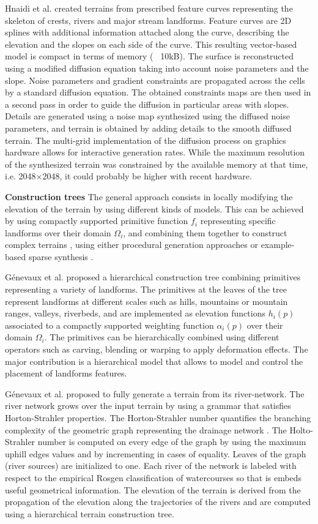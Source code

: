 \documentclass{article}
\begin{document}
Hnaidi et al. \cite{HGA10b} created terrains from prescribed feature curves representing the skeleton of crests, rivers and major stream landforms. Feature curves are 2D splines with additional information attached along the curve, describing the elevation and the slopes on each side of the curve. This resulting vector-based model is compact in terms of memory (~ 10kB). The surface is reconstructed using a modified diffusion equation taking into account noise parameters and the slope. Noise parameters and gradient constraints are propagated across the cells by a standard diffusion equation. The obtained constraints maps are then used in a second pass in order to guide the diffusion in particular areas with slopes. Details are generated using a noise map synthesized using the diffused noise parameters, and terrain is obtained by adding details to the smooth diffused terrain. The multi-grid implementation of the diffusion process on graphics hardware allows for interactive generation rates. While the maximum resolution of the synthesized terrain was constrained by the available memory at that time, i.e. 2048×2048, it could probably be higher with recent hardware.

\textbf{Construction trees} The general approach consists in locally modifying the elevation of the terrain by using different kinds of models. This can be achieved by using compactly supported primitive function $f_i$ representing specific landforms over their domain $\Omega_i$, and combining them together to construct complex terrains \cite{GGP15}, using either procedural generation approaches \cite{GGG13} or example-based sparse synthesis \cite{GDGP16}.

Génevaux et al. \cite{GGP15} proposed a hierarchical construction tree combining primitives representing a variety of landforms. The primitives at the leaves of the tree represent landforms at different scales such as hills, mountains or mountain ranges, valleys, riverbeds, and are implemented as elevation functions $h_i(p)$ associated to a compactly supported weighting function $\alpha_i(p)$ over their domain $\Omega_i$. The primitives can be hierarchically combined using different operators such as carving, blending or warping to apply deformation effects. The major contribution is a hierarchical model that allows to model and control the placement of landforms features.

Génevaux et al. \cite{GGG13} proposed to fully generate a terrain from its river-network. The river network grows over the input terrain by using a grammar that satisfies Horton-Strahler properties. The Horton-Strahler number quantifies the branching complexity of the geometric graph representing the drainage network \cite{Hor45}. The Holto-Strahler number is computed on every edge of the graph by using the maximum uphill edges values and by incrementing in cases of equality. Leaves of the graph (river sources) are initialized to one. Each river of the network is labeled with respect to the empirical Rosgen classification of watercourses \cite{Ros94} so that is embeds useful geometrical information. The elevation of the terrain is derived from the propagation of the elevation along the trajectories of the rivers and are computed using a hierarchical terrain construction tree.
\end{document}
